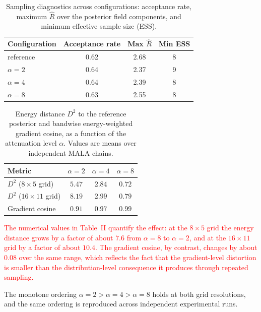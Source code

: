 \documentclass[12pt]{article}
\newcommand{\add}[1]{\textcolor{red}{#1}}
\begin{document}
\begin{table}[t]
\centering
\caption{Sampling diagnostics across configurations: acceptance rate, maximum $\hat R$ over the posterior field components, and minimum effective sample size (ESS).}
\label{tab:diag}
\begin{tabular}{lccc}
\toprule
Configuration & Acceptance rate & Max $\hat R$ & Min ESS \\
\midrule
reference & {\color{red}0.62} & {\color{red}2.68} & {\color{red}8} \\
$\alpha=2$ & {\color{red}0.64} & {\color{red}2.37} & {\color{red}9} \\
$\alpha=4$ & {\color{red}0.64} & {\color{red}2.39} & {\color{red}8} \\
$\alpha=8$ & {\color{red}0.63} & {\color{red}2.55} & {\color{red}8} \\
\bottomrule
\end{tabular}
\end{table}

\begin{table}[t]
\centering
\caption{Energy distance $D^{2}$ to the reference posterior and bandwise energy-weighted gradient cosine, as a function of the attenuation level $\alpha$. Values are means over independent MALA chains.}
\label{tab:ablation}
\begin{tabular}{lccc}
\toprule
Metric & $\alpha=2$ & $\alpha=4$ & $\alpha=8$ \\
\midrule
$D^{2}$ ($8\times5$ grid)  & {\color{red}$5.47$} & {\color{red}$2.84$} & {\color{red}$0.72$} \\
$D^{2}$ ($16\times11$ grid) & {\color{red}$8.19$} & {\color{red}$2.99$} & {\color{red}$0.79$} \\
Gradient cosine & {\color{red}$0.91$} & {\color{red}$0.97$} & {\color{red}$0.99$} \\
\bottomrule
\end{tabular}
\end{table}

\add{The numerical values in Table~II quantify the effect: at the $8\times5$ grid the energy distance grows by a factor of about $7.6$ from $\alpha=8$ to $\alpha=2$, and at the $16\times11$ grid by a factor of about $10.4$. The gradient cosine, by contrast, changes by about $0.08$ over the same range, which reflects the fact that the gradient-level distortion is smaller than the distribution-level consequence it produces through repeated sampling.}

The monotone ordering $\alpha=2>\alpha=4>\alpha=8$ holds at both grid resolutions, and the same ordering is reproduced across independent experimental runs.
\end{document}
